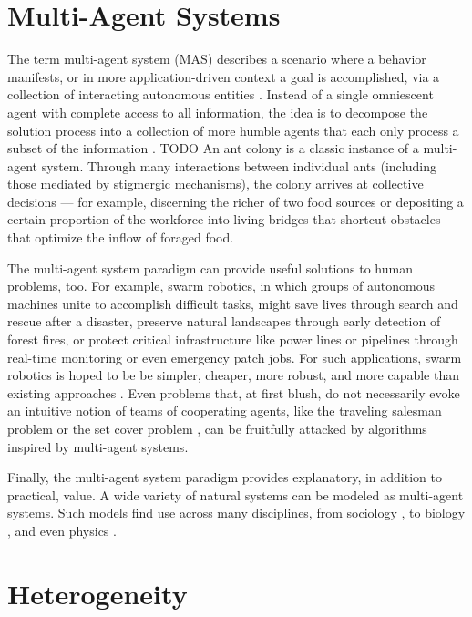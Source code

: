 \section{Multi-Agent Systems}

The term multi-agent system (MAS) describes a scenario where a behavior manifests, or in more application-driven context a goal is accomplished, via a collection of interacting autonomous entities \cite{ferber2003agents}.
Instead of a single omniescent agent with complete access to all information, the idea is to decompose the solution process into a collection of more humble agents that each only process a subset of the information \cite{panait2005cooperative}. TODO
An ant colony is a classic instance of a multi-agent system.
Through many interactions between individual ants (including those mediated by stigmergic mechanisms), the colony arrives at collective decisions --- for example, discerning the richer of two food sources \cite{beckers1993modulation} or depositing a certain proportion of the workforce into living bridges that shortcut obstacles \cite{graham2017optimal} --- that optimize the inflow of foraged food.

The multi-agent system paradigm can provide useful solutions to human problems, too.
For example, swarm robotics, in which groups of autonomous machines unite to accomplish difficult tasks, might save lives through search and rescue after a disaster, preserve natural landscapes through early detection of forest fires, or protect critical infrastructure like power lines or pipelines through real-time monitoring or even emergency patch jobs.
For such applications, swarm robotics is hoped to be be simpler, cheaper, more robust, and more capable than existing approaches \cite{tan2013research}.
Even problems that, at first blush, do not necessarily evoke an intuitive notion of teams of cooperating agents, like the traveling salesman problem \cite{dorigo1997ant, bnasin2013applications} or the set cover problem \cite{rahoual2002parallel,ren2010new}, can be fruitfully attacked by algorithms inspired by multi-agent systems.

Finally, the multi-agent system paradigm provides explanatory, in addition to practical, value.
A wide variety of natural systems can be modeled as multi-agent systems.
Such models find use across many disciplines, from sociology \cite{sawyer2003artificial}, to biology \cite{perna2012individual, amigoni2007multiagent}, and even physics \cite{vicsek1995novel}.

\section{Heterogeneity}

